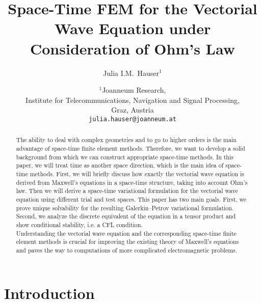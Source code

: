 \documentclass[a4paper,11pt]{article}
\begin{document}
\title{Space-Time FEM for the Vectorial Wave Equation under Consideration of Ohm's Law}
\author{Julia I.M.~Hauser$^1$}
\date{
        $^1$Joanneum Research, \\
        Institute for Telecommunications, Navigation and Signal Processing,\\
         Graz, Austria \\[1mm]
        {\tt julia.hauser@joanneum.at}  \\
      }
      
\maketitle


\begin{abstract}
  The ability to deal with complex geometries and to go to higher orders is the main advantage of space-time finite element methods. Therefore, we want to develop a solid background from which we can construct appropriate space-time methods. In this paper, we will treat time as another space direction, which is the main idea of space-time methods. First, we will briefly discuss how exactly the vectorial wave equation is derived from Maxwell's equations in a space-time structure, taking into account Ohm's law. Then we will derive a space-time variational formulation for the vectorial wave equation using different trial and test spaces. This paper has two main goals. First, we prove unique solvability for the resulting Galerkin--Petrov variational formulation. Second, we analyze the discrete equivalent of the equation in a tensor product and show conditional stability, i.e. a CFL condition.  \\
  Understanding the vectorial wave equation and the corresponding space-time finite element methods is crucial for improving the existing theory of Maxwell's equations and paves the way to computations of more complicated electromagnetic problems. 
\end{abstract}

\section{Introduction}	
\end{document}
